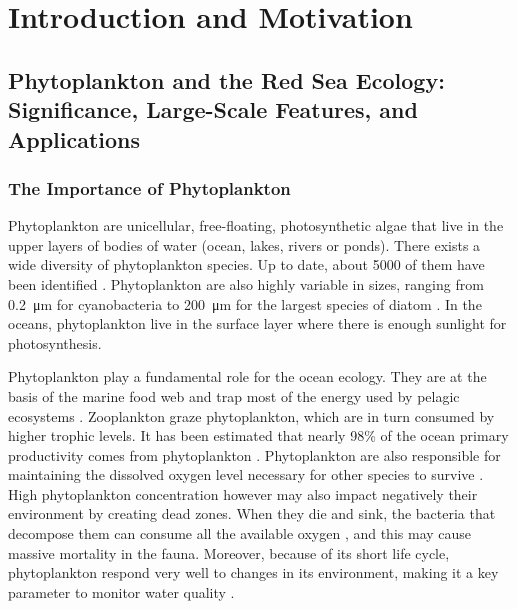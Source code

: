 \chapter{Introduction and Motivation}

\section{Phytoplankton and the Red Sea Ecology: Significance, Large-Scale
Features, and Applications}

\subsection{The Importance of Phytoplankton}

Phytoplankton are unicellular, free-floating, photosynthetic algae that live in
the upper layers of bodies of water (ocean, lakes, rivers or ponds). There
exists a wide diversity of phytoplankton species. Up to date, about 5000 of
them have been identified \citep{Tett1995}. Phytoplankton are also highly
variable in sizes, ranging from \SI{0.2}{\micro\metre} for cyanobacteria to
\SI{200}{\micro\metre} for the largest species of diatom \citep{Pal2014}. In
the oceans, phytoplankton live in the surface layer where there is enough
sunlight for photosynthesis. 

Phytoplankton play a fundamental role for the ocean ecology. They are at the
basis of the marine food web and trap most of the energy used by pelagic
ecosystems \citep{Pal2014}. Zooplankton graze phytoplankton, which are in turn
consumed by higher trophic levels. It has been estimated that nearly 98\% of
the ocean primary productivity comes from phytoplankton \citep{Pal2014}.
Phytoplankton are also responsible for maintaining the dissolved oxygen level
necessary for other species to survive \citep{Pal2014}. High phytoplankton
concentration however may also impact negatively their environment by creating
dead zones. When they die and sink, the bacteria that decompose them can
consume all the available oxygen \citep{Pal2014}, and this may cause massive
mortality in the fauna. Moreover, because of its short life cycle,
phytoplankton respond very well to changes in its environment, making it a key
parameter to monitor water quality \citep{Wu2014}.

